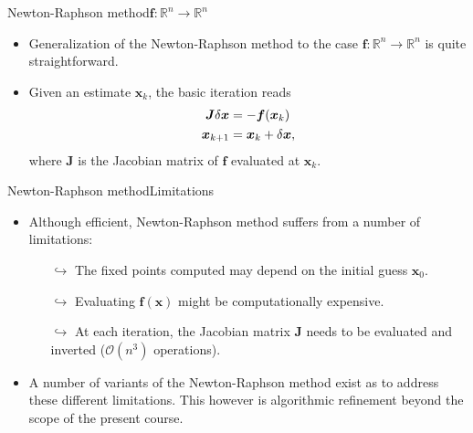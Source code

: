 \documentclass[usenames,dvipsnames,svgnames,10pt,aspectratio=169]{beamer}
\begin{document}
\begin{frame}[t, c]{Newton-Raphson method}{${\bm f} : \mathbb{R}^n \to \mathbb{R}^n$}

	\begin{itemize}
		\item Generalization of the Newton-Raphson method to the case ${\bm f} : \mathbb{R}^n \to \mathbb{R}^n$ is quite straightforward.

		\bigskip

		\item Given an estimate ${\bm x}_k$, the basic iteration reads
		\begin{equation}
			\begin{aligned}
				{\bm J} \delta {\bm x} & = - {\bm f}({\bm x}_k) \\
				{\bm x}_{k+1} & = {\bm x}_k + \delta {\bm x},
			\end{aligned}
			\notag
		\end{equation}
		where ${\bm J}$ is the Jacobian matrix of ${\bm f}$ evaluated at ${\bm x}_k$.
	\end{itemize}

	\vspace{1cm}
\end{frame}

\begin{frame}[t, c]{Newton-Raphson method}{Limitations}
	\begin{itemize}
		\item Although efficient, Newton-Raphson method suffers from a number of limitations:
		\begin{itemize}
			\item[$\hookrightarrow$] The fixed points computed may depend on the initial guess ${\bm x}_0$.
			\item[$\hookrightarrow$] Evaluating ${\bm f}({\bm x})$ might be computationally expensive.
			\item[$\hookrightarrow$] At each iteration, the Jacobian matrix ${\bm J}$ needs to be evaluated and inverted ($\mathcal{O}(n^3)$ operations).
		\end{itemize}

		\bigskip

		\item A number of variants of the Newton-Raphson method exist as to address these different limitations. This however is algorithmic refinement beyond the scope of the present course.
	\end{itemize}

	\vspace{1cm}
\end{frame}
\end{document}
